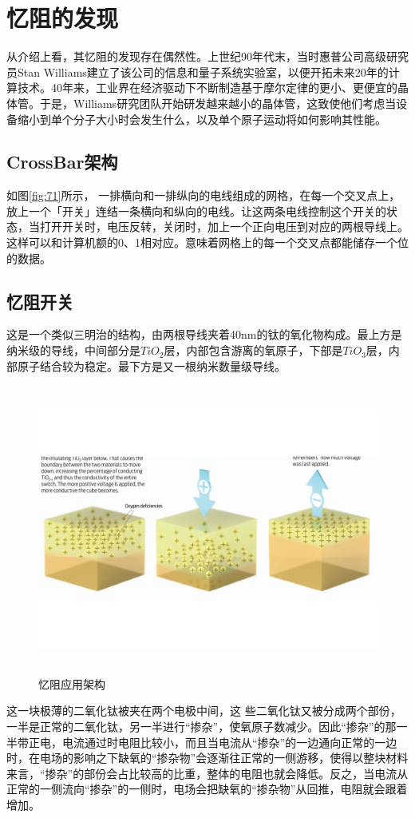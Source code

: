 \documentclass[UTF8]{article}
\begin{document}
\section{忆阻的发现}
从介绍上看，其忆阻的发现存在偶然性。上世纪90年代末，当时惠普公司高级研究员Stan Williams建立了该公司的信息和量子系统实验室，以便开拓未来20年的计算技术。40年来，工业界在经济驱动下不断制造基于摩尔定律的更小、更便宜的晶体管。于是，Williams研究团队开始研发越来越小的晶体管，这致使他们考虑当设备缩小到单个分子大小时会发生什么，以及单个原子运动将如何影响其性能。


\subsection{CrossBar架构}
如图\eqref{fig:71}所示，
一排横向和一排纵向的电线组成的网格，在每一个交叉点上，放上一个「开关」连结一条横向和纵向的电线。让这两条电线控制这个开关的状态，当打开开关时，电压反转，关闭时，加上一个正向电压到对应的两根导线上。这样可以和计算机额的0、1相对应。意味着网格上的每一个交叉点都能储存一个位的数据。


\subsection{忆阻开关}
这是一个类似三明治的结构，由两根导线夹着40nm的钛的氧化物构成。最上方是纳米级的导线，中间部分是$TiO_{2}$层，内部包含游离的氧原子，下部是$TiO_{3}$层，内部原子结合较为稳定。最下方是又一根纳米数量级导线。
\begin{figure}[htbp]
\centering
\includegraphics[width=5.77in,height=3.75in]{pic/8}
\caption{忆阻应用架构}
\label{fig:8}
\end{figure}
这一块极薄的二氧化钛被夹在两个电极中间，这
些二氧化钛又被分成两个部份，一半是正常的二氧化钛，另一半进行“掺杂”，使氧原子数减少。因此“掺杂”的那一半带正电，电流通过时电阻比较小，而且当电流从“掺杂”的一边通向正常的一边时，在电场的影响之下缺氧的“掺杂物”会逐渐往正常的一侧游移，使得以整块材料来言，“掺杂”的部份会占比较高的比重，整体的电阻也就会降低。反之，当电流从正常的一侧流向“掺杂”的一侧时，电场会把缺氧的“掺杂物”从回推，电阻就会跟着增加。
\end{document}
